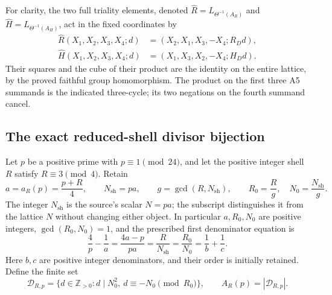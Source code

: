 For clarity, the two full triality elements, denoted
\(\widehat R=L_{\Theta^{-1}(A_R)}\) and
\(\widehat H=L_{\Theta^{-1}(A_H)}\), act in the fixed coordinates by
\[
\begin{split}
 \widehat R(X_1,X_2,X_3,X_4;d)
     &=(X_2,X_1,X_3,-X_4;R_Dd),\\
 \widehat H(X_1,X_2,X_3,X_4;d)
     &=(X_1,X_3,X_2,-X_4;H_Dd).
\end{split}
\]
Their squares and the cube of their product are the identity on the
entire lattice, by the proved faithful group homomorphism.
The product on the first three A5 summands is the indicated
three-cycle; its two negations on the fourth summand cancel.

\subsection{The exact reduced-shell divisor bijection}
\label{esn:subsec:shells}

Let \(p\) be a positive prime with \(p\equiv1\pmod {24}\), and
let the positive integer shell \(R\) satisfy \(R\equiv3\pmod4\).
Retain
\begin{equation}
 a=a_R(p)=\frac{p+R}{4},\qquad
 N_{\mathrm{sh}}=pa,\qquad g=\gcd(R,N_{\mathrm{sh}}),\qquad
 R_0=\frac Rg,\quad N_0=\frac{N_{\mathrm{sh}}}{g}.
 \label{esn:eq:shell-data}
\end{equation}
The integer \(N_{\mathrm{sh}}\) is the source's scalar \(N=pa\);
the subscript distinguishes it from the lattice \(N\) without changing
either object.  In particular \(a,R_0,N_0\) are positive integers,
\(\gcd(R_0,N_0)=1\), and the prescribed first denominator equation is
\begin{equation}
 \frac4p-\frac1a=\frac{4a-p}{pa}
       =\frac{R}{N_{\mathrm{sh}}}=\frac{R_0}{N_0}
       =\frac1b+\frac1c.
 \label{esn:eq:fixed-shell-equation}
\end{equation}
Here \(b,c\) are positive integer denominators, and their order is
initially retained.  Define the finite set
\[
 \mathcal D_{R,p}=
 \{d\in\mathbb Z_{>0}:d\mid N_0^2,
                             \ d\equiv-N_0\pmod {R_0}\},
 \qquad A_R(p)=|\mathcal D_{R,p}|.
\]


